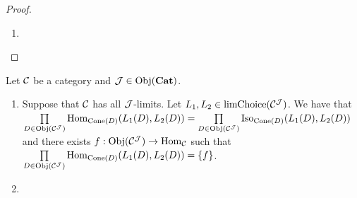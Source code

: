 \documentclass{book}
\begin{document}
\begin{proof}
\begin{enumerate}
\begin{enumerate}
			Since $L_D$ is $\bCone(D)$-terminal,
			\begin{align*}
				\lim\limits_L(\id_D^{\MC^{\MJ}})
				& = \eta^L_{\id_D^{\MC^{\MJ}}} \\
				& \in \Hom_{\bCone(D)}(\Cn_{\id_D^{\MC^{\MJ}}}(L_D), L_D) \\
				& = \Hom_{\bCone(D)}(L_D, L_D) \\
				& = \{\id_{L_D}^{\bCone(D)}\}. 
			\end{align*}
			By \rd{} , 
			\begin{align*}
				\id_{L_D}^{\bCone(D)} 
				& = \id_{L_D}^{(\Del^{\MJ} \doar D)} \\
				& = \id_{(X, \phi)}^{(\Del^{\MJ} \doar D)} \\
				& = \id_X^{\MC}.
			\end{align*}
			Therefore
			\begin{align*}
				\lim\limits_L(\id_D^{\MC^{\MJ}})
				& = \id_{L_D}^{\bCone(D)} \\
				& = \id_X^{\MC} \\
				& = \id_{\lim\limits_L(D)}^{\MC}.
			\end{align*}
		\end{enumerate}
		Hence $\lim\limits_L: \MC^{\MJ} \rightarrow \MC$ is a functor. 
		\item {}
	\end{enumerate}
\end{proof}

\begin{ex} 
	Let $\mathcal{C}$ be a category and $\mathcal{J} \in \operatorname{Obj}(\operatorname*{\text{\textbf{Cat}}})$. 
	\begin{enumerate}
		\item Suppose that $\mathcal{C}$ has all $\mathcal{J}$-limits. Let $L_1, L_2 \in \operatorname{limChoice}(\mathcal{C}^{\mathcal{J}})$. We have that $\prod\limits_{D \in \operatorname{Obj}(\mathcal{C}^{\mathcal{J}})} \operatorname{Hom}_{\text{Cone}(D)}(L_1(D), L_2(D)) = \prod\limits_{D \in \operatorname{Obj}(\mathcal{C}^{\mathcal{J}})} \operatorname{Iso}_{\text{Cone}(D)}(L_1(D), L_2(D))$ and there exists $f: \operatorname{Obj}(\mathcal{C}^{\mathcal{J}}) \rightarrow \operatorname{Hom}_{\mathcal{C}}$ such that $\prod\limits_{D \in \operatorname{Obj}(\mathcal{C}^{\mathcal{J}})} \operatorname{Hom}_{\text{Cone}(D)}(L_1(D), L_2(D)) = \{f\}$.
		\item {}
	\end{enumerate}
\end{ex}
\end{document}
